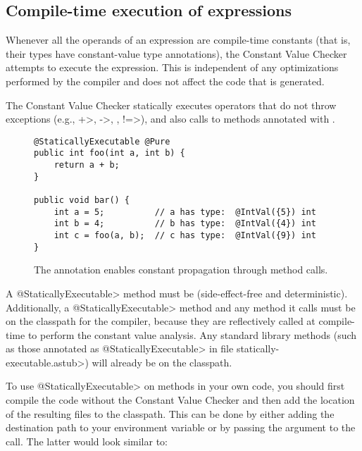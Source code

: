\subsection{Compile-time execution of expressions\label{staticallyexecutable-annotation}}

Whenever all the operands of an expression are compile-time constants (that
is, their types have constant-value type annotations), the Constant Value
Checker attempts to execute the expression.  This is independent of any
optimizations performed by the compiler and does not affect the code that
is generated.

The Constant Value Checker statically executes operators that do
not throw exceptions (e.g., \<+>, \<->, \code{<\relax<}, \<!=>), and also
calls to methods annotated with
.

\begin{figure}
\begin{Verbatim}
@StaticallyExecutable @Pure
public int foo(int a, int b) {
    return a + b;
}

public void bar() {
    int a = 5;          // a has type:  @IntVal({5}) int
    int b = 4;          // b has type:  @IntVal({4}) int
    int c = foo(a, b);  // c has type:  @IntVal({9}) int
}
\end{Verbatim}
\caption{The 
   annotation enables
  constant propagation through method calls.}
\label{fig-staticallyexecutable}
\end{figure}

A \<@StaticallyExecutable> method must
be  (side-effect-free and
deterministic).
Additionally, a \<@StaticallyExecutable> method and any method it calls must be on
the classpath for the compiler, because they are reflectively called at
compile-time to perform the constant value analysis. Any standard
library methods (such as those annotated as \<@StaticallyExecutable> in file
\<statically-executable.astub>) will already be on the
classpath.

To use \<@StaticallyExecutable> on methods in your own code, you should
first compile the code without the Constant Value Checker and then add
the location of the resulting  files to the
classpath. This can be done by either adding the destination path to
your environment variable  or by passing the
argument  to the call. The latter
would look similar to:



